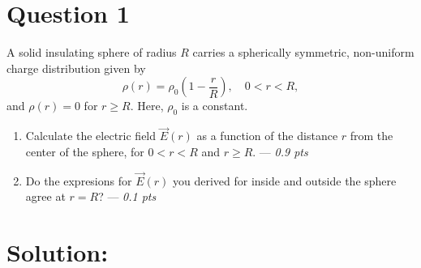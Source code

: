 \section*{Question 1}
A solid insulating sphere of radius $R$ carries a spherically symmetric, non-uniform charge distribution given by
\begin{equation*}
    \rho(r) = \rho_0 \left(1 - \frac{r}{R}\right), \quad 0 < r < R,
\end{equation*}
and $\rho(r)=0$ for $r \geq R$. Here, $\rho_0$ is a constant. 
\begin{enumerate}
    \item [(a)] Calculate the electric field $\vec{E}(r)$ as a function of the distance $r$ from the center of the sphere, for $0 < r < R$ and $r \geq R$. --- \textit{0.9 pts}
    \item [(b)] Do the expresions for $\vec{E}(r)$ you derived for inside and outside the sphere agree at $r=R$? --- \textit{0.1 pts}
\end{enumerate}

\section*{Solution:}
